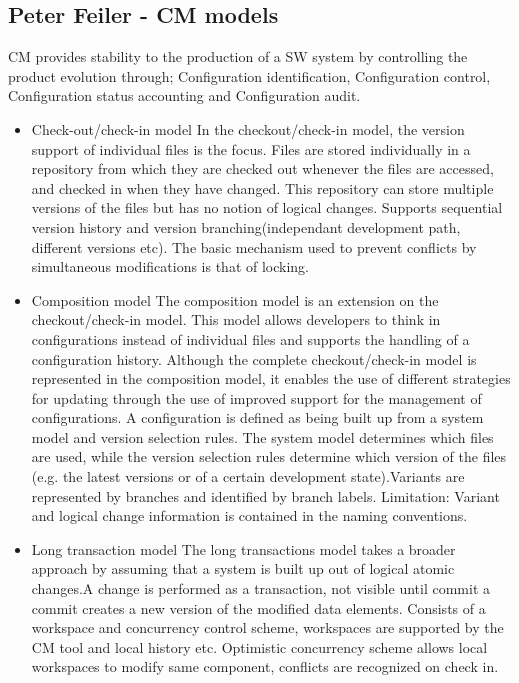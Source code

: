 \documentclass{article}
\begin{document}
\subsection{Peter Feiler - CM models}
CM provides stability to the production of a SW system by controlling the product evolution through; Configuration identification, Configuration control, Configuration status accounting and Configuration audit.
\begin{itemize}
    \item Check-out/check-in model
    In the checkout/check-in model, the version support of individual files is the focus. Files are stored individually in a repository from which they are checked out whenever the files are accessed, and checked in when they have changed.
    This repository can store multiple versions of the files but has no notion of logical changes. Supports sequential version history and version branching(independant development path, different versions etc).
    The basic mechanism used to prevent conflicts by simultaneous modifications is that of locking.
    \item Composition model 
    The composition model is an extension on the checkout/check-in model. This model allows developers to think in configurations instead of individual files and supports the handling of a configuration history.
    Although the complete checkout/check-in model is represented in the composition model, it enables the use of different strategies for updating through the use of
    improved support for the management of configurations. A configuration is defined as being built up from a system model and version selection rules.
    The system model determines which files are used, while the version selection rules determine which version of the files (e.g. the latest versions or of a certain development state).Variants are represented by branches
    and identified by branch labels. Limitation:  Variant and logical change information is contained in the naming conventions.
    \item Long transaction model
    The long transactions model takes a broader approach by assuming that a system is built up out of logical atomic changes.A change is performed as a transaction, not visible until commit a commit creates a new version
    of the modified data elements. Consists of a workspace and concurrency control scheme, workspaces are supported by the CM tool and local history etc. Optimistic concurrency scheme allows local workspaces to 
    modify same component, conflicts are recognized on check in.

\end{itemize}
\end{document}
